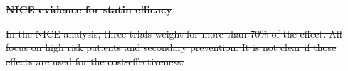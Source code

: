\documentclass[10pt,letterpaper]{article}
\providecommand{\DIFdeltex}[1]{{\protect\color{red}\sout{#1}}}                      %
\providecommand{\DIFdelbegin}{} %
\providecommand{\DIFdelend}{} %
\providecommand{\DIFdel}[1]{\texorpdfstring{\DIFdeltex{#1}}{}} %
\newcommand{\DIFscaledelfig}{0.5}
\newlength{\DIFdelgraphicswidth} %
\newlength{\DIFdelgraphicsheight} %
\newcommand{\DIFdelincludegraphics}[2][]{%
\sbox{\DIFdelgraphicsbox}{\DIFOincludegraphics[#1]{#2}}%
\settoboxwidth{\DIFdelgraphicswidth}{\DIFdelgraphicsbox} %
\settoboxtotalheight{\DIFdelgraphicsheight}{\DIFdelgraphicsbox} %
\scalebox{\DIFscaledelfig}{%
\parbox[b]{\DIFdelgraphicswidth}{\usebox{\DIFdelgraphicsbox}\\[-\baselineskip] \rule{\DIFdelgraphicswidth}{0em}}\llap{\resizebox{\DIFdelgraphicswidth}{\DIFdelgraphicsheight}{%
\setlength{\unitlength}{\DIFdelgraphicswidth}%
\begin{picture}(1,1)%
\thicklines\linethickness{2pt} %
{\color[rgb]{1,0,0}\put(0,0){\framebox(1,1){}}}%
{\color[rgb]{1,0,0}\put(0,0){\line( 1,1){1}}}%
{\color[rgb]{1,0,0}\put(0,1){\line(1,-1){1}}}%
\end{picture}%
}\hspace*{3pt}}} %
} %
\DeclareRobustCommand{\DIFdelbegin}{\DIFOdelbegin \let\includegraphics\DIFdelincludegraphics} %
\DeclareRobustCommand{\DIFdelend}{\DIFOaddend \let\includegraphics\DIFOincludegraphics} %
\begin{document}
\DIFdelbegin \textbf{\DIFdel{NICE evidence for statin efficacy}}
\DIFdelend %

\DIFdelbegin \DIFdel{In the NICE analysis, three trials weight for more than 70\% of the effect. All
  focus on high risk patients and secondary prevention. It is not clear if
  those effects are used for the cost-effectiveness.
}\DIFdelend %
\end{document}
